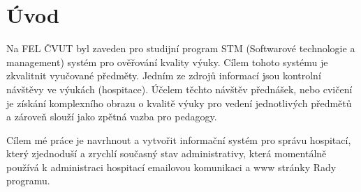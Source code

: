 \chapter{Úvod}

Na FEL ČVUT byl zaveden pro studijní program STM (Softwarové technologie a management) systém pro ověřování kvality výuky. Cílem tohoto systému je zkvalitnit vyučované předměty. Jedním ze zdrojů informací jsou kontrolní návštěvy ve výukách (hospitace). Účelem těchto návštěv přednášek, nebo cvičení je získání komplexního obrazu o kvalitě výuky pro vedení jednotlivých předmětů a zároveň slouží jako zpětná vazba pro pedagogy. 

Cílem mé práce je navrhnout a vytvořit informační systém pro správu hospitací, který zjednoduší a zrychlí současný stav administrativy, která momentálně používá k administraci hospitací emailovou komunikaci a www stránky Rady programu.